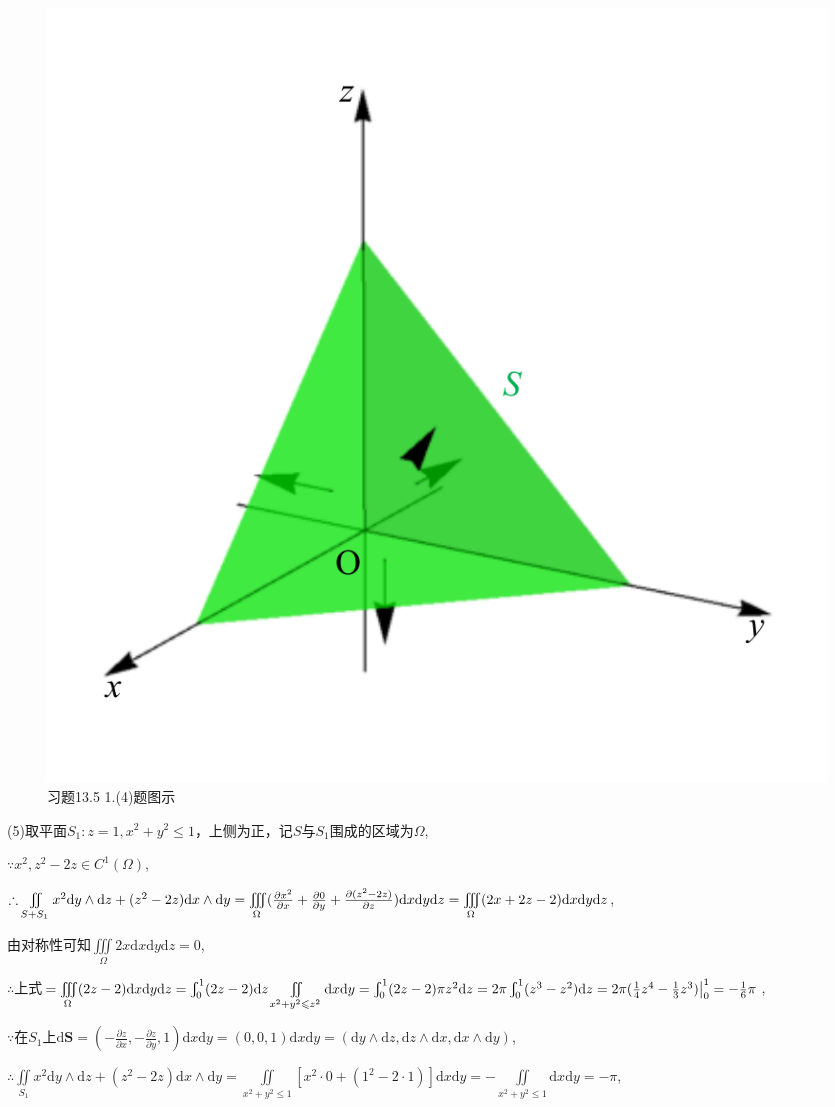 \documentclass[12pt,UTF8,fleqn]{ctexart}
\newcommand{\Int}[4]{\varint\nolimits_{#1}^{#2}#3\mathrm d#4}
\newcommand{\varIInt}[4]{\iint\limits_{#1}#2\mathrm d#3\mathrm d#4}
\newcommand{\varIIInt}[5]{\iiint\limits_{#1}#2\mathrm d#3\mathrm d#4\mathrm d#5}
\newcommand{\md}[1]{\mathrm d#1}
\newcommand{\BSIInt}[2]{\iint\limits_{#1}#2}
\newcommand{\pp}[2]{\frac{\partial #1}{\partial #2}}
\begin{document}
\begin{enumerate}
\begin{figure}[H]
\begin{center}
\includegraphics[height=0.5\textheight]{Figures24/Fig13-5-1-4.pdf}
\end{center}
\caption{习题13.5 1.(4)题图示}
\label{13-5-1-4}
\end{figure}

(5)取平面$S_1:z=1,x^2+y^2\leqslant1$，上侧为正，记$S$与$S_1$围成的区域为$\Omega$,

$\because x^2,z^2-2z\in C^1(\Omega)$,

$\therefore\BSIInt{S+S_1}{x^2\md y\wedge\md z+(z^2-2z)\md x\wedge\md y}=\varIIInt\Omega{(\pp{x^2}x+\pp0y+\pp{(z^2-2z)}z)}xyz\\
=\varIIInt\Omega{(2x+2z-2)}xyz$,

由对称性可知$\varIIInt\Omega{2x}xyz=0$,

$\therefore$上式$=\varIIInt\Omega{(2z-2)}xyz=\Int01{(2z-2)}z\varIInt{x^2+y^2\leqslant z^2}{}xy=\Int01{(2z-2)\pi z^2}z\\
=2\pi\Int01{(z^3-z^2)}z=2\pi(\frac14z^4-\frac13z^3)\big|_0^1=-\frac16\pi$,

$\because$在$S_1$上$\md\bm S=(-\pp zx,-\pp zy,1)\md x\md y=(0,0,1)\md x\md y=(\md y\wedge\md z,\md z\wedge\md x,\md x\wedge\md y)$,

$\therefore\BSIInt{S_1}{x^2\md y\wedge\md z+(z^2-2z)\md x\wedge\md y}=\varIInt{x^2+y^2\leqslant1}{[x^2\cdot0+(1^2-2\cdot1)]}xy=-\varIInt{x^2+y^2\leqslant1}{}xy=-\pi$,


\end{enumerate}
\end{document}

